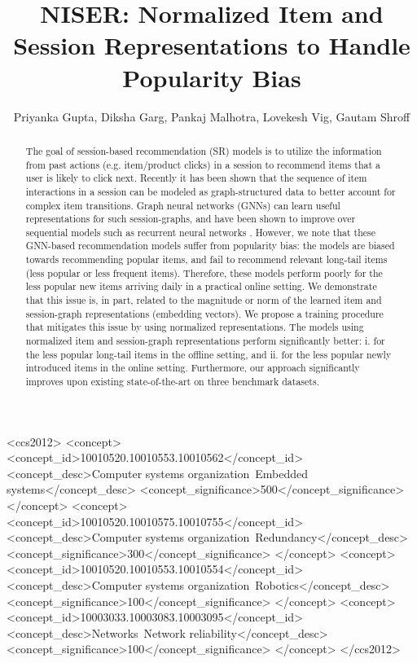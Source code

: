 \documentclass[sigconf]{acmart}
\begin{document}
\title[NISER: Normalized Item and Session Representations with Graph Neural Networks]{NISER: Normalized Item and Session Representations to Handle Popularity Bias}


\author{ Priyanka Gupta, Diksha Garg, Pankaj Malhotra, Lovekesh Vig, Gautam Shroff}


\renewcommand{\shortauthors}{P. Gupta, Di. Garg, et al.}



\begin{abstract}
The goal of session-based recommendation (SR) models is to utilize the information from past actions (e.g. item/product clicks) in a session to recommend items that a user is likely to click next.
Recently it has been shown that the sequence of item interactions in a session can be modeled as graph-structured data to better account for  complex item transitions.
Graph neural networks (GNNs) can learn useful representations for such session-graphs, and have been shown to improve over sequential models such as recurrent neural networks \cite{wu2018session}.
However, we note that these GNN-based recommendation models suffer from popularity bias: the models are biased towards recommending popular items, and fail to recommend relevant long-tail items (less popular or less frequent items). 
Therefore, these models perform poorly for the less popular new items arriving daily in a practical online setting. We demonstrate that this issue is, in part, related to the magnitude or norm of the learned item and session-graph representations (embedding vectors). 
We propose a training procedure that mitigates this issue by using normalized representations.
The models using normalized item and session-graph representations perform significantly better: 
i. for the less popular long-tail items in the offline setting, and 
ii. for the less popular newly introduced items in the online setting. 
Furthermore, our approach significantly improves upon existing state-of-the-art on three benchmark datasets.
\end{abstract}

\iffalse
\begin{CCSXML}
<ccs2012>
 <concept>
  <concept_id>10010520.10010553.10010562</concept_id>
  <concept_desc>Computer systems organization~Embedded systems</concept_desc>
  <concept_significance>500</concept_significance>
 </concept>
 <concept>
  <concept_id>10010520.10010575.10010755</concept_id>
  <concept_desc>Computer systems organization~Redundancy</concept_desc>
  <concept_significance>300</concept_significance>
 </concept>
 <concept>
  <concept_id>10010520.10010553.10010554</concept_id>
  <concept_desc>Computer systems organization~Robotics</concept_desc>
  <concept_significance>100</concept_significance>
 </concept>
 <concept>
  <concept_id>10003033.10003083.10003095</concept_id>
  <concept_desc>Networks~Network reliability</concept_desc>
  <concept_significance>100</concept_significance>
 </concept>
</ccs2012>
\end{CCSXML}
\end{document}
